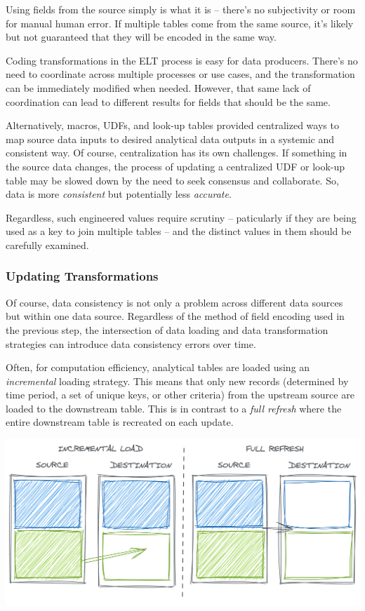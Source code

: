 \documentclass[
]{krantz}
\begin{document}
Using fields from the source simply is what it is -- there's no subjectivity or room for manual human error. If multiple tables come from the same source, it's likely but not guaranteed that they will be encoded in the same way.

Coding transformations in the ELT process is easy for data producers. There's no need to coordinate across multiple processes or use cases, and the transformation can be immediately modified when needed. However, that same lack of coordination can lead to different results for fields that should be the same.

Alternatively, macros, UDFs, and look-up tables provided centralized ways to map source data inputs to desired analytical data outputs in a systemic and consistent way. Of course, centralization has its own challenges. If something in the source data changes, the process of updating a centralized UDF or look-up table may be slowed down by the need to seek consensus and collaborate. So, data is more \emph{consistent} but potentially less \emph{accurate}.

Regardless, such engineered values require scrutiny -- paticularly if they are being used as a key to join multiple tables -- and the distinct values in them should be carefully examined.

\hypertarget{updating-transformations}{%
\subsubsection{Updating Transformations}\label{updating-transformations}}

Of course, data consistency is not only a problem across different data sources but within one data source. Regardless of the method of field encoding used in the previous step, the intersection of data loading and data transformation strategies can introduce data consistency errors over time.

Often, for computation efficiency, analytical tables are loaded using an \emph{incremental} loading strategy. This means that only new records (determined by time period, a set of unique keys, or other criteria) from the upstream source are loaded to the downstream table. This is in contrast to a \emph{full refresh} where the entire downstream table is recreated on each update.

\begin{center}\includegraphics[width=0.9\linewidth]{figures/data-dall/incr-full-good} \end{center}
\end{document}
